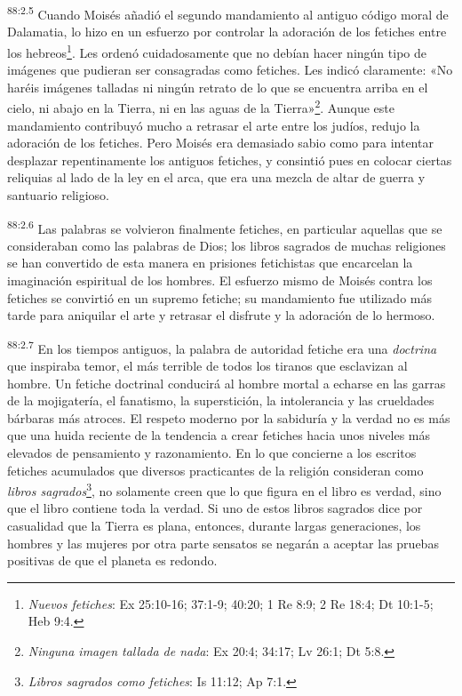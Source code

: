 \par
\textsuperscript{88:2.5} Cuando Moisés añadió el segundo mandamiento al antiguo código moral de Dalamatia, lo hizo en un esfuerzo por controlar la adoración de los fetiches entre los hebreos\footnote{\textit{Nuevos fetiches}: Ex 25:10-16; 37:1-9; 40:20; 1 Re 8:9; 2 Re 18:4; Dt 10:1-5; Heb 9:4.}. Les ordenó cuidadosamente que no debían hacer ningún tipo de imágenes que pudieran ser consagradas como fetiches. Les indicó claramente: «No haréis imágenes talladas ni ningún retrato de lo que se encuentra arriba en el cielo, ni abajo en la Tierra, ni en las aguas de la Tierra»\footnote{\textit{Ninguna imagen tallada de nada}: Ex 20:4; 34:17; Lv 26:1; Dt 5:8.}. Aunque este mandamiento contribuyó mucho a retrasar el arte entre los judíos, redujo la adoración de los fetiches. Pero Moisés era demasiado sabio como para intentar desplazar repentinamente los antiguos fetiches, y consintió pues en colocar ciertas reliquias al lado de la ley en el arca, que era una mezcla de altar de guerra y santuario religioso.

\par
\textsuperscript{88:2.6} Las palabras se volvieron finalmente fetiches, en particular aquellas que se consideraban como las palabras de Dios; los libros sagrados de muchas religiones se han convertido de esta manera en prisiones fetichistas que encarcelan la imaginación espiritual de los hombres. El esfuerzo mismo de Moisés contra los fetiches se convirtió en un supremo fetiche; su mandamiento fue utilizado más tarde para aniquilar el arte y retrasar el disfrute y la adoración de lo hermoso.

\par
\textsuperscript{88:2.7} En los tiempos antiguos, la palabra de autoridad fetiche era una \textit{doctrina} que inspiraba temor, el más terrible de todos los tiranos que esclavizan al hombre. Un fetiche doctrinal conducirá al hombre mortal a echarse en las garras de la mojigatería, el fanatismo, la superstición, la intolerancia y las crueldades bárbaras más atroces. El respeto moderno por la sabiduría y la verdad no es más que una huida reciente de la tendencia a crear fetiches hacia unos niveles más elevados de pensamiento y razonamiento. En lo que concierne a los escritos fetiches acumulados que diversos practicantes de la religión consideran como \textit{libros sagrados}\footnote{\textit{Libros sagrados como fetiches}: Is 11:12; Ap 7:1.}, no solamente creen que lo que figura en el libro es verdad, sino que el libro contiene toda la verdad. Si uno de estos libros sagrados dice por casualidad que la Tierra es plana, entonces, durante largas generaciones, los hombres y las mujeres por otra parte sensatos se negarán a aceptar las pruebas positivas de que el planeta es redondo.

